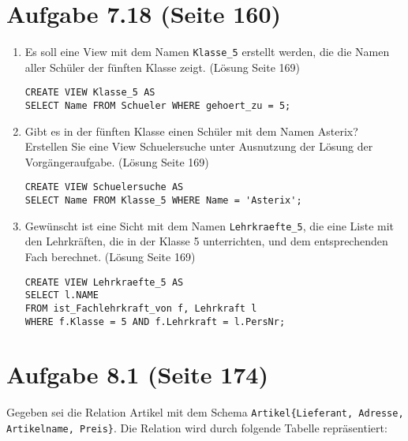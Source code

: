 \documentclass{lehramt-informatik}
\begin{document}
%

\section{Aufgabe 7.18 (Seite 160)}

\begin{enumerate}
\item Es soll eine View mit dem Namen \verb|Klasse_5| erstellt werden,
die die Namen aller Schüler der fünften Klasse zeigt. (Lösung Seite 169)

\begin{verbatim}
CREATE VIEW Klasse_5 AS
SELECT Name FROM Schueler WHERE gehoert_zu = 5;
\end{verbatim}

\item Gibt es in der fünften Klasse einen Schüler mit dem Namen Asterix?
Erstellen Sie eine View Schuelersuche unter Ausnutzung der Lösung der
Vorgängeraufgabe. (Lösung Seite 169)

\begin{verbatim}
CREATE VIEW Schuelersuche AS
SELECT Name FROM Klasse_5 WHERE Name = 'Asterix';
\end{verbatim}

\item Gewünscht ist eine Sicht mit dem Namen \verb|Lehrkraefte_5|, die
eine Liste mit den Lehrkräften, die in der Klasse 5 unterrichten, und
dem entsprechenden Fach berechnet. (Lösung Seite 169)

\begin{verbatim}
CREATE VIEW Lehrkraefte_5 AS
SELECT l.NAME
FROM ist_Fachlehrkraft_von f, Lehrkraft l
WHERE f.Klasse = 5 AND f.Lehrkraft = l.PersNr;
\end{verbatim}

\end{enumerate}

%

\section{Aufgabe 8.1 (Seite 174)}

Gegeben sei die Relation Artikel mit dem Schema
\texttt{Artikel\{Lieferant, Adresse, Artikelname, Preis\}}. Die
Relation wird durch folgende Tabelle repräsentiert:
\end{document}
